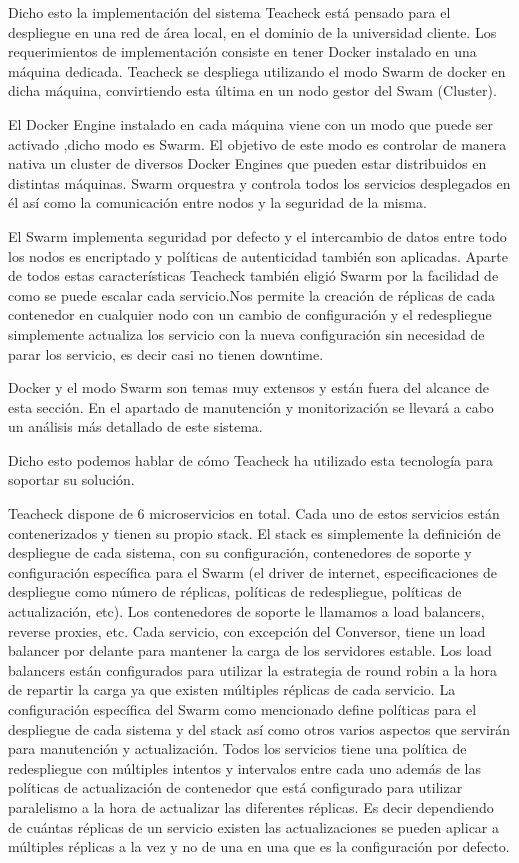 Dicho esto la implementación del sistema Teacheck está pensado para el
despliegue en una red de área local, en el dominio de la universidad
cliente. Los requerimientos de implementación consiste en tener Docker
instalado en una máquina dedicada. Teacheck se despliega utilizando el
modo Swarm de docker en dicha máquina, convirtiendo esta última en un
nodo gestor del Swam (Cluster).

El Docker Engine instalado en cada máquina viene con un modo que puede
ser activado ,dicho modo es Swarm. El objetivo de este modo es
controlar de manera nativa un cluster de diversos Docker Engines que
pueden estar distribuidos en distintas máquinas. Swarm orquestra y
controla todos los servicios desplegados en él así como la
comunicación entre nodos y la seguridad de la misma.

El Swarm implementa seguridad por defecto y el intercambio de datos
entre todo los nodos es encriptado y políticas de autenticidad también
son aplicadas. Aparte de todos estas características Teacheck también
eligió Swarm por la facilidad de como se puede escalar cada
servicio.Nos permite la creación de réplicas de cada contenedor en
cualquier nodo con un cambio de configuración y el redespliegue
simplemente actualiza los servicio con la nueva configuración sin
necesidad de parar los servicio, es decir casi no tienen downtime.

Docker y el modo Swarm son temas muy extensos y están fuera del
alcance de esta sección. En el apartado de manutención y
monitorización se llevará a cabo un análisis más detallado de este
sistema.

Dicho esto podemos hablar de cómo Teacheck ha utilizado esta
tecnología para soportar su solución.

Teacheck dispone de 6 microservicios en total. Cada uno de estos
servicios están contenerizados y tienen su propio stack. El stack es
simplemente la definición de despliegue de cada sistema, con su
configuración, contenedores de soporte y configuración específica para
el Swarm (el driver de internet, especificaciones de despliegue como
número de réplicas, políticas de redespliegue, políticas de
actualización, etc). Los contenedores de soporte le llamamos a load
balancers, reverse proxies, etc. Cada servicio, con excepción del
Conversor, tiene un load balancer por delante para mantener la carga
de los servidores estable. Los load balancers están configurados para
utilizar la estrategia de round robin a la hora de repartir la carga
ya que existen múltiples réplicas de cada servicio. La configuración
específica del Swarm como mencionado define políticas para el
despliegue de cada sistema y del stack así como otros varios aspectos
que servirán para manutención y actualización.  Todos los servicios
tiene una política de redespliegue con múltiples intentos y intervalos
entre cada uno además de las políticas de actualización de contenedor
que está configurado para utilizar paralelismo a la hora de actualizar
las diferentes réplicas. Es decir dependiendo de cuántas réplicas de
un servicio existen las actualizaciones se pueden aplicar a múltiples
réplicas a la vez y no de una en una que es la configuración por
defecto.


